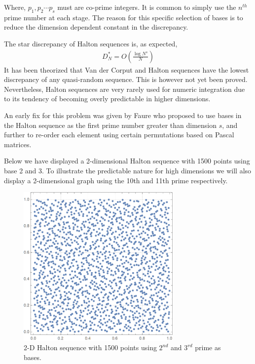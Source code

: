 \documentclass[12pt]{article}
\numberwithin{equation}{section}
\begin{document}
Where, $p_1, p_2 \cdots p_s$ must are co-prime integers. It is common to simply use the $n^{th}$ prime number at each stage. The reason for this specific selection of bases is to reduce the dimension dependent constant in the discrepancy.
\par The star discrepancy of Halton sequences is, as expected,
\begin{align}
    D_N^*= O \left( \frac{\log N^s}{N}\right)
\end{align}
It has been theorized that Van der Corput and Halton sequences have the lowest discrepancy of any quasi-random sequence. This is however not yet been proved. Nevertheless, Halton sequences are very rarely used for numeric integration  due to its tendency of becoming overly predictable in higher dimensions.
\par An early fix for this problem was given by Faure \cite{faure} who proposed to use bases in the Halton sequence as the first prime number greater than dimension $s$, and further to re-order each element using certain permutations based on Pascal matrices.
\par Below we have displayed a 2-dimensional Halton sequence with 1500 points using base 2 and 3. To illustrate the predictable nature for high dimensions we will also display a 2-dimensional graph using the 10th and 11th prime respectively.
\begin{figure}[!htb]
    \centering
    \includegraphics[width=8cm]{Images/23halton.png}
    \caption{2-D Halton sequence with 1500 points using $2^{nd}$ and $3^{rd}$ prime as bases.}
    \label{fig:example23halton}
\end{figure}
\end{document}
